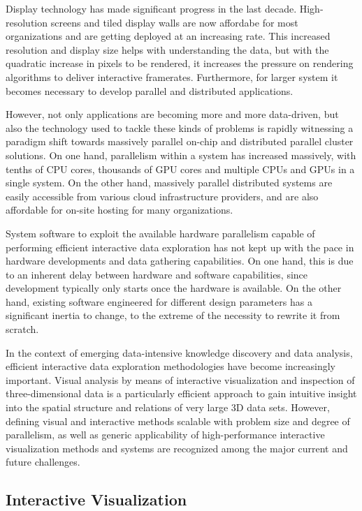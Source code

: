 Display technology has made significant progress in the last decade.
High-resolution screens and tiled display walls are now affordabe for most
organizations and are getting deployed at an increasing rate. This increased
resolution and display size helps with understanding the data, but with the
quadratic increase in pixels to be rendered, it increases the pressure on
rendering algorithms to deliver interactive framerates. Furthermore, for larger
system it becomes necessary to develop parallel and distributed applications.

However, not only applications are becoming more and more data-driven, but also
the technology used to tackle these kinds of problems is rapidly witnessing a
paradigm shift towards massively parallel on-chip and distributed parallel
cluster solutions. On one hand, parallelism within a system has increased
massively, with tenths of CPU cores, thousands of GPU cores and multiple CPUs
and GPUs in a single system. On the other hand, massively parallel distributed
systems are easily accessible from various cloud infrastructure providers, and
are also affordable for on-site hosting for many organizations.

System software to exploit the available hardware parallelism capable of
performing efficient interactive data exploration has not kept up with the pace
in hardware developments and data gathering capabilities. On one hand, this is
due to an inherent delay between hardware and software capabilities, since
development typically only starts once the hardware is available. On the other
hand, existing software engineered for different design parameters has a
significant inertia to change, to the extreme of the necessity to rewrite it
from scratch.

In the context of emerging data-intensive knowledge discovery and data analysis,
efficient interactive data exploration methodologies have become increasingly
important. Visual analysis by means of interactive visualization and inspection
of three-dimensional data is a particularly efficient approach to gain intuitive
insight into the spatial structure and relations of very large 3D data sets.
However, defining visual and interactive methods scalable with problem size and
degree of parallelism, as well as generic applicability of high-performance
interactive visualization methods and systems are recognized among the major
current and future challenges.

\subsection{Interactive Visualization}

